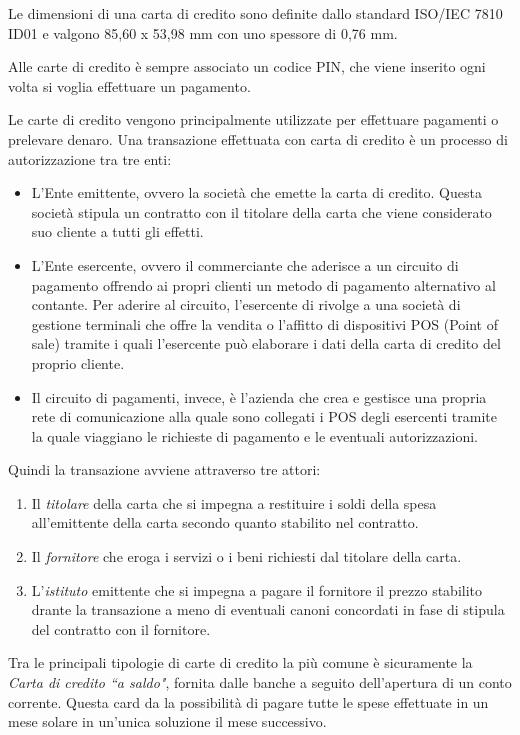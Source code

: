Le dimensioni di una carta di credito sono definite dallo standard ISO/IEC 7810 ID01 e valgono 85,60 x 53,98 mm con uno spessore di 0,76 mm.

Alle carte di credito è sempre associato un codice PIN, che viene inserito ogni volta si voglia effettuare un pagamento.

Le carte di credito vengono principalmente utilizzate per effettuare pagamenti o prelevare denaro. Una transazione effettuata con carta di credito è un processo di autorizzazione tra tre enti:
\begin{itemize}
    \item L'Ente emittente, ovvero la società che emette la carta di credito. Questa società stipula un contratto con il titolare della carta che viene considerato suo cliente a tutti gli effetti.
    \item L'Ente esercente, ovvero il commerciante che aderisce a un circuito di pagamento offrendo ai propri clienti un metodo di pagamento alternativo al contante. Per aderire al circuito, l'esercente di rivolge a una società di gestione terminali che offre la vendita o l'affitto di dispositivi POS (Point of sale) tramite i quali l'esercente può elaborare i dati della carta di credito del proprio cliente.
    \item Il circuito di pagamenti, invece, è l'azienda che crea e gestisce una propria rete di comunicazione alla quale sono collegati i POS degli esercenti tramite la quale viaggiano le richieste di pagamento e le eventuali autorizzazioni.
\end{itemize}
Quindi la transazione avviene attraverso tre attori:
\begin{enumerate}
    \item Il \textit{titolare} della carta che si impegna a restituire i soldi della spesa all'emittente della carta secondo quanto stabilito nel contratto.
    \item Il \textit{fornitore} che eroga i servizi o i beni richiesti dal titolare della carta.
    \item L'\textit{istituto} emittente che si impegna a pagare il fornitore il prezzo stabilito drante la transazione a meno di eventuali canoni concordati in fase di stipula del contratto con il fornitore.
\end{enumerate}

Tra le principali tipologie di carte di credito la più comune è sicuramente la \textit{Carta di credito ``a saldo"}, fornita dalle banche a seguito dell'apertura di un conto corrente. Questa card da la possibilità di pagare tutte le spese effettuate in un mese solare in un'unica soluzione il mese successivo.

